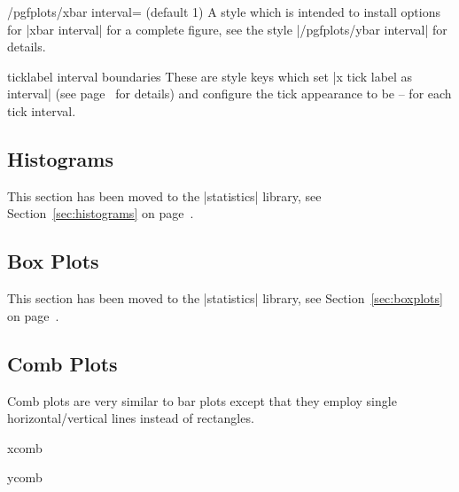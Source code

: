 {\begin{stylekey}{/pgfplots/xbar interval= (default 1)}
    A style which is intended to install options for |xbar interval| for a
    complete figure, see the style |/pgfplots/ybar interval| for details.
\end{stylekey}

\begin{pgfplotsxykey}{\x ticklabel interval boundaries}
    These are style keys which set |x tick label as interval| (see
    page~\pageref{key:pgfplots:ticklabelasinterval} for details) and configure
    the tick appearance to be  --  for each tick
    interval.
\end{pgfplotsxykey}


\subsection{Histograms}

This section has been moved to the |statistics| library, see
Section~\ref{sec:histograms} on page~\pageref{sec:histograms}.


\subsection{Box Plots}

This section has been moved to the |statistics| library, see
Section~\ref{sec:boxplots} on page~\pageref{sec:boxplots}.


\subsection{Comb Plots}

Comb plots are very similar to bar plots except that they employ single
horizontal/vertical lines instead of rectangles.

\begin{plottype}{xcomb}
\begin{codeexample}[]
\end{codeexample}
\end{plottype}

\begin{plottype}{ycomb}
\begin{codeexample}[]
\end{codeexample}
\end{plottype}


}
